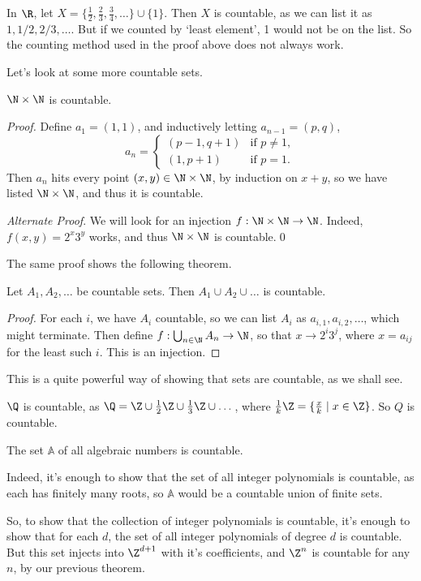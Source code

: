 \documentclass[a4paper]{scrreprt}
\begin{document}
\begin{remark}[A Warning]
	In $\R$, let $X = \{\frac{1}{2}, \frac{2}{3}, \frac{3}{4}, \dots \} \cup \{1\}$. Then $X$ is countable, as we can list it as $1, 1/2, 2/3, \dots$. But if we counted by `least element', 1 would not be on the list. So the counting method used in the proof above does not always work.
\end{remark}

Let's look at some more countable sets.

\begin{theorem}
	$\N \times \N$ is countable.
\end{theorem}
\begin{proof}
	Define $a_1 = (1, 1)$, and inductively letting $a_{n - 1} = (p, q)$, 
	$$
a_n = \begin{cases}
	(p - 1, q + 1) &\mbox{if } p \neq 1, \\
	(1, p + 1) &\mbox{if } p = 1.
   \end{cases}
	$$
	Then $a_n$ hits every point $(x, y) \in \N \times \N$, by induction on $x + y$, so we have listed $\N \times \N$, and thus it is countable. \qedhere
	
	\emph{Alternate Proof}. We will look for an injection $f : \N \times \N \rightarrow \N$. Indeed, $f(x, y) = 2^x 3^y$ works, and thus $\N \times \N$ is countable.\hfill \qed
\end{proof}

The same proof shows the following theorem.

\begin{theorem}
	Let $A_1, A_2, \dots$ be countable sets. Then $A_1 \cup A_2 \cup \dots$ is countable.
\end{theorem}
\begin{proof}
	For each $i$, we have $A_i$ countable, so we can list $A_i$ as $a_{i, 1}, a_{i, 2}, \dots$, which might terminate.
	Then define $f : \bigcup_{n \in \N} A_n \rightarrow \N$, so that $x \rightarrow 2^i 3^j$, where $x = a_{ij}$ for the least such $i$.
This is an injection.
\end{proof}

This is a quite powerful way of showing that sets are countable, as we shall see.

\begin{example}
	$\Q$ is countable, as $\Q = \Z \cup \frac{1}{2}\Z \cup \frac{1}{3}\Z \cup \dots$, where $\frac{1}{k}\Z = \{\frac{x}{k} \mid x \in \Z\}$. So $Q$ is countable.
\end{example}
\begin{example}
	The set $\mathbb{A}$ of all algebraic numbers is countable. 
	
	Indeed, it's enough to show that the set of all integer polynomials is countable, as each has finitely many roots, so $\mathbb{A}$ would be a countable union of finite sets.

	So, to show that the collection of integer polynomials is countable, it's enough to show that for each $d$, the set of all integer polynomials of degree $d$ is countable. But this set injects into $\Z^{d + 1}$ with it's coefficients, and $\Z^n$ is countable for any $n$, by our previous theorem.
\end{example}
\end{document}
